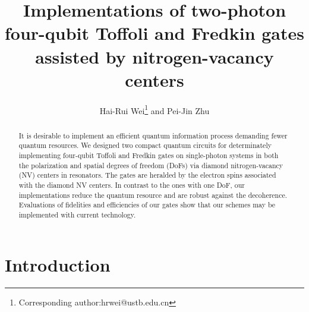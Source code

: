 \documentclass[showpacs,preprintnumbers,showkeys,amsmath,amssymb]{revtex4}%
\begin{document}
\preprint{}

\title{Implementations of two-photon four-qubit Toffoli and Fredkin gates assisted by nitrogen-vacancy centers}

\author{Hai-Rui Wei\footnote{Corresponding author:hrwei@ustb.edu.cn} and Pei-Jin Zhu }

\address{School of Mathematics and Physics, University of Science and Technology Beijing, Beijing 100083, China}





\begin{abstract}
It is desirable to implement an efficient quantum information process demanding fewer quantum resources.  We designed two compact quantum circuits for determinately implementing four-qubit Toffoli and Fredkin gates on single-photon systems in both the polarization and spatial degrees of freedom (DoFs) via diamond nitrogen-vacancy (NV) centers in resonators. The gates are heralded by the electron spins associated with the diamond NV centers. In contrast to the ones with one DoF, our implementations reduce the quantum resource and are robust against the decoherence. Evaluations of fidelities and efficiencies of our gates show that our schemes may be implemented with current technology.
\end{abstract}





\maketitle





\section{Introduction}
\end{document}

